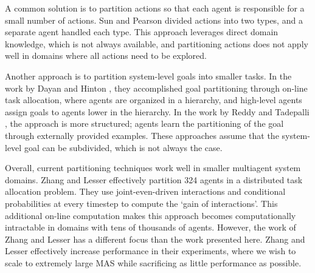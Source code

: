 \documentclass[letterpaper]{article}
\begin{document}
A common solution is to partition actions so that each agent is responsible for a small number of actions. Sun and Pearson  divided actions into two types, and a separate agent handled each type. This approach leverages direct domain knowledge, which is not always available, and partitioning actions does not apply well in domains where all actions need to be explored.

Another approach is to partition system-level goals into smaller tasks. In the work by Dayan and Hinton , they accomplished goal partitioning through on-line task allocation, where agents are organized in a hierarchy, and high-level agents assign goals to agents lower in the hierarchy. In the work by Reddy and Tadepalli , the approach is more structured; agents learn the partitioning of the goal through externally provided examples. These approaches assume that the system-level goal can be subdivided, which is not always the case. 

Overall, current partitioning techniques work well in smaller multiagent system domains. Zhang and Lesser  effectively partition 324 agents in a distributed task allocation problem. They use joint-even-driven interactions and conditional probabilities at every timestep to compute the `gain of interactions'. This additional on-line computation makes this approach becomes computationally intractable in domains with tens of thousands of agents. However, the work of Zhang and Lesser has a different focus than the work presented here. Zhang and Lesser effectively increase performance in their experiments, where we wish to scale to extremely large MAS while sacrificing as little performance as possible.

\end{document}

